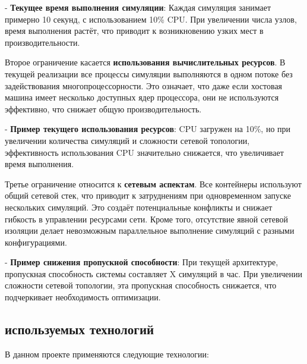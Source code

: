 - \textbf{Текущее время выполнения симуляции}: Каждая симуляция занимает примерно 10 секунд, с использованием 10\% CPU. При увеличении числа узлов, время выполнения растёт, что приводит к возникновению узких мест в производительности.

Второе ограничение касается \textbf{использования вычислительных ресурсов}. В текущей реализации все процессы симуляции выполняются в одном потоке без задействования многопроцессорности. Это означает, что даже если хостовая машина имеет несколько доступных ядер процессора, они не используются эффективно, что снижает общую производительность.

- \textbf{Пример текущего использования ресурсов}: CPU загружен на 10\%, но при увеличении количества симуляций и сложности сетевой топологии, эффективность использования CPU значительно снижается, что увеличивает время выполнения.

Третье ограничение относится к \textbf{сетевым аспектам}. Все контейнеры используют общий сетевой стек, что приводит к затруднениям при одновременном запуске нескольких симуляций. Это создаёт потенциальные конфликты и снижает гибкость в управлении ресурсами сети. Кроме того, отсутствие явной сетевой изоляции делает невозможным параллельное выполнение симуляций с разными конфигурациями.

- \textbf{Пример снижения пропускной способности}: При текущей архитектуре, пропускная способность системы составляет X симуляций в час. При увеличении сложности сетевой топологии, эта пропускная способность снижается, что подчеркивает необходимость оптимизации.

\subsection{используемых технологий}

В данном проекте применяются следующие технологии:

